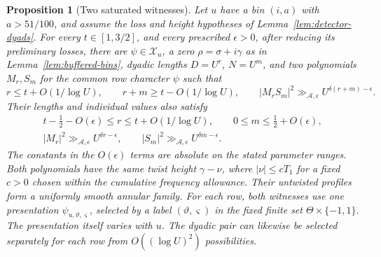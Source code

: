 \documentclass[12pt]{article}
\newtheorem{proposition}[theorem]{Proposition}
\begin{document}
\begin{proposition}[Two saturated witnesses]\label{prop:detector-witness}
Let \(u\) have a bin \((i,a)\) with \(a>51/100\), and assume the
loss and height hypotheses of Lemma~\ref{lem:detector-dyads}.
For every \(t\in[1,3/2]\),
and every prescribed \(\epsilon>0\),
after reducing its preliminary losses, there are
\(\psi\in\mathcal X_u\), a zero \(\rho=\sigma+i\gamma\) as in
Lemma~\ref{lem:buffered-bins}, dyadic lengths \(D=U^r\), \(N=U^m\),
and two polynomials \(M_r,S_m\) for the common row character
\(\psi\) such that
\begin{equation}\label{eq:detector-note}
 r\le t+O(1/\log U),\qquad
 r+m\ge t-O(1/\log U),\qquad
 |M_rS_m|^2\gg_{\mathcal A,\epsilon}
 U^{\delta(r+m)-\epsilon}.
\end{equation}
Their lengths and individual values also satisfy
\begin{equation}\label{eq:saturated-witness}
 \begin{gathered}
 t-\tfrac12-O(\epsilon)\le r\le t+O(1/\log U),
 \qquad 0\le m\le\tfrac12+O(\epsilon),\\
 |M_r|^2\gg_{\mathcal A,\epsilon}U^{\delta r-\epsilon},
 \qquad
 |S_m|^2\gg_{\mathcal A,\epsilon}U^{\delta m-\epsilon}.
 \end{gathered}
\end{equation}
The constants in the \(O(\epsilon)\) terms are absolute on the
stated parameter ranges.  Both polynomials have the same twist
height \(\gamma-\nu\), where \(|\nu|\le cT_1\) for a fixed
\(c>0\) chosen within the cumulative frequency allowance.
Their untwisted profiles form a uniformly smooth annular family.
For each row, both witnesses use one presentation
\(\psi_{u,\vartheta,\varsigma}\), selected by a label
\((\vartheta,\varsigma)\) in the fixed finite set
\(\Theta\times\{-1,1\}\).  The presentation itself varies with \(u\).
The dyadic pair can likewise
be selected separately for each row from \(O((\log U)^2)\) possibilities.
\end{proposition}
\end{document}
